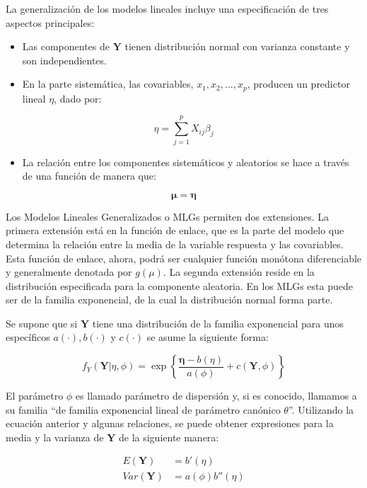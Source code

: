\documentclass[]{book}
\providecommand{\tightlist}{%
  \setlength{\itemsep}{0pt}\setlength{\parskip}{0pt}}
\begin{document}
La generalización de los modelos lineales incluye una especificación de tres aspectos principales:

\begin{itemize}
\tightlist
\item
  Las componentes de \(\mathbf{Y}\) tienen distribución normal con varianza constante y son independientes.
\item
  En la parte sistemática, las covariables, \(x_1, x_2, ..., x_p\), producen un predictor
  lineal \(\eta\), dado por:
\end{itemize}

\[ \eta= \sum_{j=1}^p  X_{ij}\beta_j \]

\begin{itemize}
\tightlist
\item
  La relación entre los componentes sistemáticos y aleatorios se hace a través de una función de manera que:
\end{itemize}

\[\mathbf{\mu}=\mathbf{\eta}\]

Los Modelos Lineales Generalizados o MLGs permiten dos extensiones. La primera extensión está en la función de enlace, que es la parte del modelo que determina la relación entre la media de la variable respuesta y las covariables. Esta función de enlace, ahora, podrá ser cualquier función monótona diferenciable y generalmente denotada por \(g(\mu)\). La segunda extensión reside en la distribución especificada para la componente aleatoria. En los MLGs esta puede ser de la familia exponencial, de la cual la distribución normal forma parte.

Se supone que si \(\mathbf{Y}\) tiene una distribución de la familia exponencial para unos específicos \(a(\cdot), b(\cdot)\) y \(c(\cdot)\) se asume la siguiente forma:

\[
f_Y ( \mathbf{Y} | \eta,\phi) = \exp \left\{ \dfrac{\mathbf{\eta} - b(\eta)}{a(\phi)} + c(\mathbf{Y},\phi) \right\}
\]

El parámetro \(\phi\) es llamado parámetro de dispersión y, si es conocido, llamamos a su familia ``de familia exponencial lineal de parámetro canónico \(\theta\)''. Utilizando la ecuación anterior y algunas relaciones, se puede obtener expresiones para la media y la varianza de \(\mathbf{Y}\) de la siguiente manera:

\[
\begin{align}
        E(\mathbf{Y}) & = b'(\eta) \\
        Var(\mathbf{Y}) & =  a(\phi)b''(\eta)
\end{align}
\]
\end{document}
